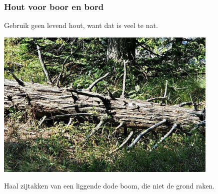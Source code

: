 \documentclass[a4paper, handout]{beamer}
\begin{document}
\begin{frame}
	\frametitle{Hout voor boor en bord}
	Gebruik geen levend hout, want dat is veel te nat.

		\includegraphics[width=0.80\textwidth]{dode-boom}

	Haal zijtakken van een liggende dode boom, die niet de grond raken.
\end{frame}
\end{document}
